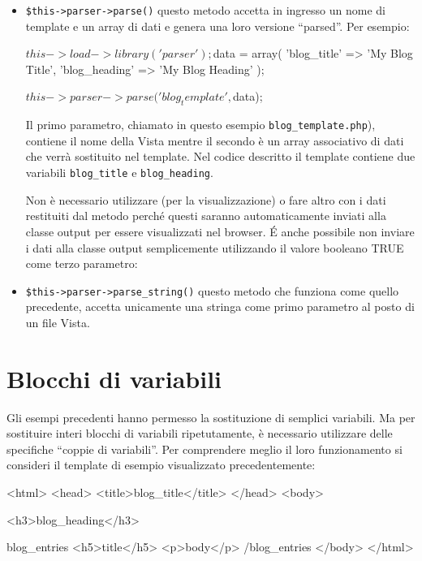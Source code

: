 \begin{itemize}
\item \verb|$this->parser->parse()| questo metodo accetta in ingresso un nome di template e un array di dati e genera una loro versione ``parsed''. Per esempio:

\begin{code}
$this->load->library('parser');

$data = array(
            'blog_title' => 'My Blog Title',
            'blog_heading' => 'My Blog Heading'
            );

$this->parser->parse('blog_template', $data);
\end{code}

Il primo parametro, chiamato in questo esempio \verb|blog_template.php|), contiene il nome della Vista mentre il secondo è un array associativo di dati che verrà sostituito nel template. Nel codice descritto il template contiene due variabili \verb|blog_title| e \verb|blog_heading|.

Non è necessario utilizzare  (per la visualizzazione) o fare altro con i dati restituiti dal metodo  perché questi saranno automaticamente inviati alla classe output per essere visualizzati nel browser. \'E anche possibile non inviare i dati alla classe output semplicemente utilizzando il valore booleano TRUE come terzo parametro:


\item \verb|$this->parser->parse_string()| questo metodo che funziona come quello precedente, accetta unicamente una stringa come primo parametro al posto di un file Vista.
\end{itemize}

\section*{Blocchi di variabili}
Gli esempi precedenti hanno permesso la sostituzione di semplici variabili. Ma per sostituire interi blocchi di variabili ripetutamente, è necessario utilizzare delle specifiche ``coppie di variabili''. Per comprendere meglio il loro funzionamento si consideri il template di esempio visualizzato precedentemente:

\begin{html}
<html>
<head>
<title>{blog_title}</title>
</head>
<body>

<h3>{blog_heading}</h3>

{blog_entries}
<h5>{title}</h5>
<p>{body}</p>
{/blog_entries}
</body>
</html>
\end{html}

